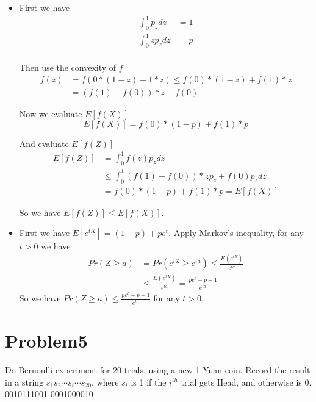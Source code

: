 \documentclass[12pt]{article}
\begin{document}
\begin{itemize}
    \item 
    First we have
    \begin{equation}
        \begin{split}
        \int_{0}^{1} p_z dz &= 1\\
        \int_{0}^{1} z p_z dz &= p \\
        \end{split}
    \end{equation}
    
    Then use the convexity of $f$
    \begin{equation}
        \begin{split}
        f(z) &= f(0*(1-z) + 1*z) \le f(0)*(1-z) + f(1)*z \\
        &= (f(1)-f(0))*z + f(0)
        \end{split}
    \end{equation}
    
    Now we evaluate $E[f(X)]$
    \begin{equation}
        E[f(X)]=f(0)*(1-p) + f(1)*p
    \end{equation}
    
    And evaluate $E[f(Z)]$
    \begin{equation}
        \begin{split}
        E[f(Z)] &= \int_{0}^{1} f(z) p_z dz \\
        &\le \int_{0}^{1} (f(1)-f(0))*zp_z + f(0)p_z dz \\
        &= f(0)*(1-p)+f(1)*p=E[f(X)]
        \end{split}
    \end{equation}
    
    So we have $E[f(Z)] \le E[f(X)]$.
    
    \item
    First we have $E[e^{tX}] = (1-p) + pe^t$.
    Apply Markov's inequality, for any $t>0$ we have
    \begin{equation}
        \begin{split}
        Pr(Z \ge a) &= Pr(e^{tZ} \ge e^{ta}) \le \frac{E(e^{tZ})}{e^{ta}} \\
        &\le \frac{E(e^{tX})}{e^{ta}} = \frac{pe^t-p+1}{e^{ta}}
        \end{split}
    \end{equation}
    So we have $Pr(Z \ge a) \le \frac{pe^t-p+1}{e^{ta}}$ for any $t>0$.
    
\end{itemize}

\section{Problem5}
Do Bernoulli experiment for 20 trials, using a new 1-Yuan coin. Record the result in a string $s_1s_2 \cdots s_i \cdots s_{20}$, where $s_i$ is 1 if the $i^{th}$ trial gets Head, and otherwise is 0.\\

0010111001 0001000010
\end{document}
